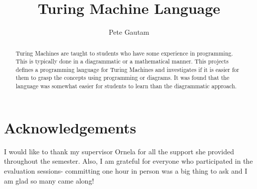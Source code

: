\documentclass{l4proj}
\begin{document}
\title{Turing Machine Language} 
\author{Pete Gautam}

\maketitle

\begin{abstract}
    Turing Machines are taught to students who have some experience in programming. This is typically done in a diagrammatic or a mathematical manner. This projects defines a programming language for Turing Machines and investigates if it is easier for them to grasp the concepts using programming or diagrams. It was found that the language was somewhat easier for students to learn than the diagrammatic approach. 
\end{abstract}

\chapter*{Acknowledgements}

I would like to thank my supervisor Ornela for all the support she provided throughout the semester. Also, I am grateful for everyone who participated in the evaluation sessions- committing one hour in person was a big thing to ask and I am glad so many came along!

\def\consentname {Pete Gautam} 
\def\consentdate {27 September 2022} 
\educationalconsent

\tableofcontents







  



\renewcommand{\thechapter}{0} 

\end{document}
